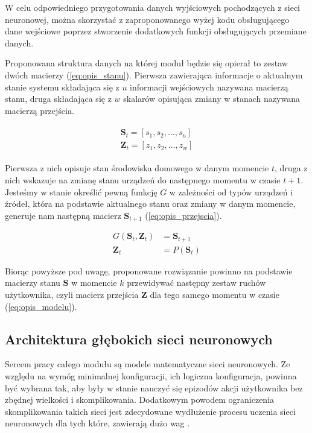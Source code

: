 W celu odpowiedniego przygotowania danych wyjściowych pochodzących z sieci neuronowej, można skorzystać z zaproponowanego wyżej kodu obsługującego dane wejściowe poprzez stworzenie dodatkowych funkcji obsługujących przemiane danych. %

Proponowana struktura danych na której moduł będzie się opierał to zestaw dwóch macierzy (\ref{eq:opis_stanu}). Pierwsza zawierająca informacje o aktualnym stanie systemu składająca się z $u$ informacji wejściowych nazywana macierzą stanu, druga składająca się z $w$ skalarów opisująca zmiany w stanach nazywana macierzą przejścia. 

\begin{align}
    \begin{split}
        \mathbf{S}_t = \left[s_1, s_2, \dots, s_u\right] \\
        \mathbf{Z}_t = \left[z_1, z_2, \dots, z_w\right]
    \end{split}
    \label{eq:opis_stanu}
\end{align}


Pierwsza z nich opisuje stan środowiska domowego w danym momencie $t$, druga z nich wskazuje na zmianę stanu urządzeń do następnego momentu w czasie $t+1$. Jesteśmy w stanie określić pewną funkcję $G$ w zależności od typów urządzeń i źródeł, która na podstawie aktualnego stanu oraz zmiany w danym momencie, generuje nam następną macierz $\mathbf{S}_{t+1}$ (\ref{eq:opis_przejscia}).

\begin{align}
    G\left(\mathbf{S}_t, \mathbf{Z}_t\right) &= \mathbf{S}_{t+1} \label{eq:opis_przejscia} \\
    \mathbf{Z}_t &= P(\mathbf{S}_t) \label{eq:opis_modelu}
\end{align}

Biorąc powyższe pod uwagę, proponowane rozwiązanie powinno na podstawie macierzy stanu $\mathbf{S}$ w momencie $k$ przewidywać następny zestaw ruchów użytkownika, czyli macierz przejścia $\mathbf{Z}$ dla tego samego momentu w czasie (\ref{eq:opis_modelu}).

\subsection{Architektura głębokich sieci neuronowych} \label{subsec:nn}
Sercem pracy całego modułu są modele matematyczne sieci neuronowych. Ze względu na wymóg minimalnej konfiguracji, ich logiczna konfiguracja, powinna być wybrana tak, aby były w stanie nauczyć się epizodów akcji użytkownika bez zbędnej wielkości i skomplikowania. Dodatkowym powodem ograniczenia skomplikowania takich sieci jest zdecydowane wydłużenie procesu uczenia sieci neuronowych dla tych które, zawierają dużo wag \cite{time_complexity_nn}.

